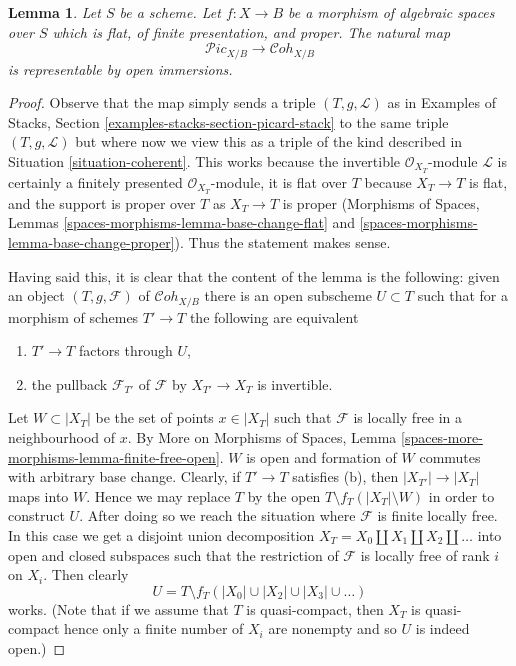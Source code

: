 \documentclass{stacks-project}
\theoremstyle{plain}
\newtheorem{lemma}[subsection]{Lemma}
\theoremstyle{definition}
\theoremstyle{remark}
\numberwithin{equation}{subsection}
\def\Cohstack{\mathcal{C}\!\mathit{oh}}
\def\Picardstack{\mathcal{P}\!\mathit{ic}}
\begin{document}
\begin{lemma}
\label{lemma-picard-stack-open-in-coh}
Let $S$ be a scheme. Let $f : X \to B$ be a morphism of algebraic spaces
over $S$ which is flat, of finite presentation, and proper.
The natural map
$$
\Picardstack_{X/B} \longrightarrow \Cohstack_{X/B}
$$
is representable by open immersions.
\end{lemma}

\begin{proof}
Observe that the map simply sends a triple $(T, g, \mathcal{L})$
as in Examples of Stacks, Section \ref{examples-stacks-section-picard-stack}
to the same triple $(T, g, \mathcal{L})$ but where now we view
this as a triple of the kind described in
Situation \ref{situation-coherent}.
This works because the invertible $\mathcal{O}_{X_T}$-module
$\mathcal{L}$ is certainly a finitely presented $\mathcal{O}_{X_T}$-module,
it is flat over $T$ because $X_T \to T$ is flat, and the support is
proper over $T$ as $X_T \to T$ is proper
(Morphisms of Spaces, Lemmas \ref{spaces-morphisms-lemma-base-change-flat}
and \ref{spaces-morphisms-lemma-base-change-proper}).
Thus the statement makes sense.

\medskip\noindent
Having said this, it is clear that the content of the lemma is the
following: given an object $(T, g, \mathcal{F})$ of
$\Cohstack_{X/B}$ there is an open subscheme $U \subset T$
such that for a morphism of schemes $T' \to T$ the following
are equivalent
\begin{enumerate}
\item[(a)] $T' \to T$ factors through $U$,
\item[(b)] the pullback $\mathcal{F}_{T'}$ of
$\mathcal{F}$ by $X_{T'} \to X_T$ is invertible.
\end{enumerate}
Let $W \subset |X_T|$ be the set of points $x \in |X_T|$
such that $\mathcal{F}$ is locally free in a neighbourhood of $x$. By
More on Morphisms of Spaces, Lemma
\ref{spaces-more-morphisms-lemma-finite-free-open}.
$W$ is open and formation
of $W$ commutes with arbitrary base change.
Clearly, if $T' \to T$ satisfies (b), then $|X_{T'}| \to |X_T|$
maps into $W$. Hence we may replace $T$ by the open
$T \setminus f_T(|X_T| \setminus W)$ in order
to construct $U$. After doing so we reach the situation
where $\mathcal{F}$ is finite locally free.
In this case we get a disjoint union decomposition
$X_T = X_0 \amalg X_1 \amalg X_2 \amalg \ldots$
into open and closed subspaces such that the restriction of
$\mathcal{F}$ is locally free of rank $i$ on $X_i$. Then clearly
$$
U = T \setminus f_T(|X_0| \cup |X_2| \cup |X_3| \cup \ldots )
$$
works. (Note that if we assume that $T$ is quasi-compact, then
$X_T$ is quasi-compact hence only a finite number of $X_i$
are nonempty and so $U$ is indeed open.)
\end{proof}
\end{document}
